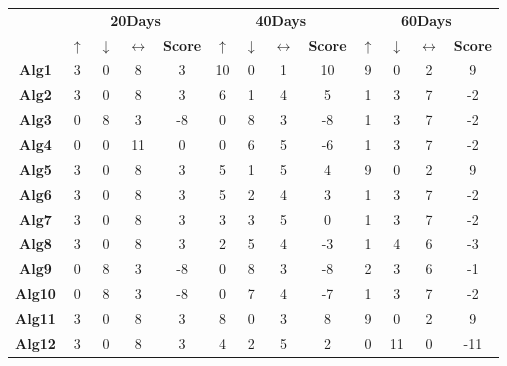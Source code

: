 \documentclass{article}
\begin{document}
\begin{table}[]
\begin{tabular}{c|c|c|c|c|c|c|c|c|c|c|c|c|}
\cline{2-13}
 & \multicolumn{4}{c|}{\textbf{20Days}} & \multicolumn{4}{c|}{\textbf{40Days}} & \multicolumn{4}{c|}{\textbf{60Days}} \\ \cline{2-13} 
 & \textbf{$\uparrow$} & \textbf{$\downarrow$} & \textbf{$\leftrightarrow$} & \textbf{Score} &\textbf{$\uparrow$} & \textbf{$\downarrow$} & \textbf{$\leftrightarrow$} & \textbf{Score} & \textbf{$\uparrow$} & \textbf{$\downarrow$} & \textbf{$\leftrightarrow$} & \textbf{Score} \\ \hline
\multicolumn{1}{|c|}{\textbf{Alg1}} & 3 & 0 & 8 & 3 & 10 & 0 & 1 & 10 & 9 & 0 & 2 & 9 \\ \hline
\multicolumn{1}{|c|}{\textbf{Alg2}} & 3 & 0 & 8 & 3 & 6 & 1 & 4 & 5 & 1 & 3 & 7 & -2 \\ \hline
\multicolumn{1}{|c|}{\textbf{Alg3}} & 0 & 8 & 3 & -8 & 0 & 8 & 3 & -8 & 1 & 3 & 7 & -2 \\ \hline
\multicolumn{1}{|c|}{\textbf{Alg4}} & 0 & 0 & 11 & 0 & 0 & 6 & 5 & -6 & 1 & 3 & 7 & -2 \\ \hline
\multicolumn{1}{|c|}{\textbf{Alg5}} & 3 & 0 & 8 & 3 & 5 & 1 & 5 & 4 & 9 & 0 & 2 & 9 \\ \hline
\multicolumn{1}{|c|}{\textbf{Alg6}} & 3 & 0 & 8 & 3 & 5 & 2 & 4 & 3 & 1 & 3 & 7 & -2 \\ \hline
\multicolumn{1}{|c|}{\textbf{Alg7}} & 3 & 0 & 8 & 3 & 3 & 3 & 5 & 0 & 1 & 3 & 7 & -2 \\ \hline
\multicolumn{1}{|c|}{\textbf{Alg8}} & 3 & 0 & 8 & 3 & 2 & 5 & 4 & -3 & 1 & 4 & 6 & -3 \\ \hline
\multicolumn{1}{|c|}{\textbf{Alg9}} & 0 & 8 & 3 & -8 & 0 & 8 & 3 & -8 & 2 & 3 & 6 & -1 \\ \hline
\multicolumn{1}{|c|}{\textbf{Alg10}} & 0 & 8 & 3 & -8 & 0 & 7 & 4 & -7 & 1 & 3 & 7 & -2 \\ \hline
\multicolumn{1}{|c|}{\textbf{Alg11}} & 3 & 0 & 8 & 3 & 8 & 0 & 3 & 8 & 9 & 0 & 2 & 9 \\ \hline
\multicolumn{1}{|c|}{\textbf{Alg12}} & 3 & 0 & 8 & 3 & 4 & 2 & 5 & 2 & 0 & 11 & 0 & -11 \\ \hline
\end{tabular}
\end{table}
\end{document}
